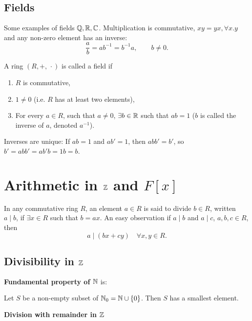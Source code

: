 \documentclass[10pt, a4paper]{article}
\begin{document}
\subsection{Fields}

Some examples of fields $\mathbb{Q}, \mathbb{R}, \mathbb{C}$.
Multiplication is commutative,
$xy = yx, \forall x. y$ and any non-zero element has an inverse:
\[
\frac{a}{b} = ab ^ {-1} = b ^ {-1}a,\qquad b \neq 0.
\]

\begin{definition}[Field]
    A ring $(R, +,\,\cdot)$ is called a field if
    \begin{enumerate}[label = \roman*)]
        \item $R$ is commutative,

        \item $1 \neq 0$
        (i.e. $R$ has at least two elements),

        \item For every $a \in R$,
        such that $a \neq 0$,
        $\exists b \in \mathbb{R}$ such that $ab = 1$
        ($b$ is called the inverse of $a$,
        denoted $a ^ {-1}$).
    \end{enumerate}
\end{definition}

Inverses are unique:
If $ab = 1$ and $ab' = 1$,
then $abb' = b'$,
so $b' = abb' = ab'b = 1b = b$.

\section{Arithmetic in \texorpdfstring{$\mathbb{Z}$}{} and \texorpdfstring{$F[x]$}{}}
In any commutative ring $R$,
an element $a \in R$ is said to divide $b \in R$,
written $a \mid b$,
if $\exists x \in R$ such that $b = ax$.
An easy observation if $a \mid b$ and $a \mid c$,
$a, b, c \in R$,
then
\[
a \mid (bx + cy)\quad\forall x, y \in R.
\]

\subsection{Divisibility in \texorpdfstring{$\mathbb{Z}$}{}}

\textbf{Fundamental property of $\mathbb{N}$} is:
\begin{lemma}
    Let $S$ be a non-empty subset of $\mathbb{N}_0 = \mathbb{N} \cup \{0\}$.
    Then $S$ has a smallest element.
\end{lemma}

\textbf{Division with remainder in $\mathbb{Z}$}
\end{document}

